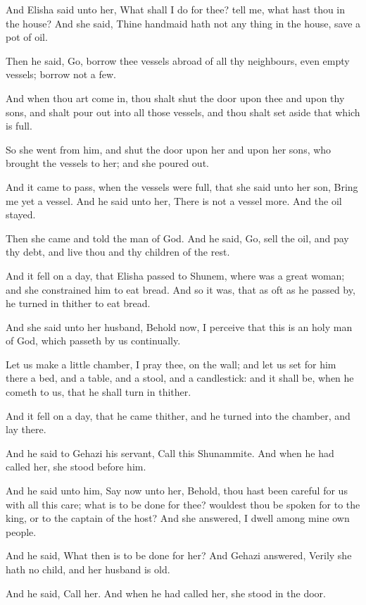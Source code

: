 \verse And Elisha said unto her, What shall I do for thee? tell me, what hast thou in the house? And she said, Thine handmaid hath not any thing in the house, save a pot of oil.

\verse Then he said, Go, borrow thee vessels abroad of all thy neighbours, even empty vessels; borrow not a few.

\verse And when thou art come in, thou shalt shut the door upon thee and upon thy sons, and shalt pour out into all those vessels, and thou shalt set aside that which is full.

\verse So she went from him, and shut the door upon her and upon her sons, who brought the vessels to her; and she poured out.

\verse And it came to pass, when the vessels were full, that she said unto her son, Bring me yet a vessel. And he said unto her, There is not a vessel more. And the oil stayed.

\verse Then she came and told the man of God. And he said, Go, sell the oil, and pay thy debt, and live thou and thy children of the rest.

\verse And it fell on a day, that Elisha passed to Shunem, where was a great woman; and she constrained him to eat bread. And so it was, that as oft as he passed by, he turned in thither to eat bread.

\verse And she said unto her husband, Behold now, I perceive that this is an holy man of God, which passeth by us continually.

\verse Let us make a little chamber, I pray thee, on the wall; and let us set for him there a bed, and a table, and a stool, and a candlestick: and it shall be, when he cometh to us, that he shall turn in thither.

\verse And it fell on a day, that he came thither, and he turned into the chamber, and lay there.

\verse And he said to Gehazi his servant, Call this Shunammite. And when he had called her, she stood before him.

\verse And he said unto him, Say now unto her, Behold, thou hast been careful for us with all this care; what is to be done for thee?  wouldest thou be spoken for to the king, or to the captain of the host? And she answered, I dwell among mine own people.

\verse And he said, What then is to be done for her? And Gehazi answered, Verily she hath no child, and her husband is old.

\verse And he said, Call her. And when he had called her, she stood in the door.

